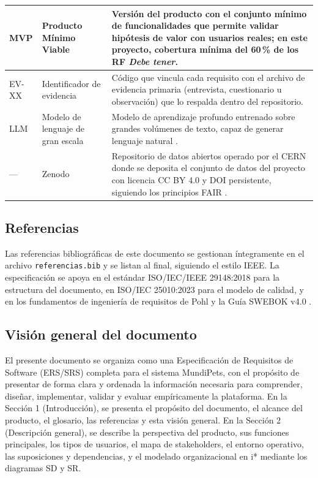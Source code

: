 \documentclass[journal,onecolumn]{IEEEtran}
\begin{document}
\begin{longtable}{|p{2.2cm}|p{3.3cm}|p{9.5cm}|}
		MVP & Producto Mínimo Viable & Versión del producto con el conjunto mínimo de funcionalidades que permite validar hipótesis de valor con usuarios reales; en este proyecto, cobertura mínima del 60\,\% de los RF \emph{Debe tener}. \\ \hline
		
		EV-XX & Identificador de evidencia & Código que vincula cada requisito con el archivo de evidencia primaria (entrevista, cuestionario u observación) que lo respalda dentro del repositorio. \\ \hline
		
		LLM & Modelo de lenguaje de gran escala & Modelo de aprendizaje profundo entrenado sobre grandes volúmenes de texto, capaz de generar lenguaje natural \cite{cheng2026, vogelsang2024}. \\ \hline
		
		--- & Zenodo & Repositorio de datos abiertos operado por el CERN donde se deposita el conjunto de datos del proyecto con licencia CC BY 4.0 y DOI persistente, siguiendo los principios FAIR \cite{wilkinson2016}. \\ \hline
	\end{longtable}
	
	\subsection{Referencias}
	\label{sec:referencias-intro}
	
	Las referencias bibliográficas de este documento se gestionan íntegramente en el
	archivo \texttt{referencias.bib} y se listan al final, siguiendo el estilo IEEE.
	La especificación se apoya en el estándar ISO/IEC/IEEE 29148:2018 \cite{iso29148}
	para la estructura del documento, en ISO/IEC 25010:2023 \cite{iso25010} para el
	modelo de calidad, y en los fundamentos de ingeniería de requisitos de
	Pohl \cite{pohl2025} y la Guía SWEBOK v4.0 \cite{swebok2024}.
	
	\subsection{Visión general del documento}
	\label{sec:vision}
	
	El presente documento se organiza como una Especificación de Requisitos de
	Software (ERS/SRS) completa para el sistema MundiPets, con el propósito de
	presentar de forma clara y ordenada la información necesaria para comprender,
	diseñar, implementar, validar y evaluar empíricamente la plataforma. En la
	Sección 1 (Introducción), se presenta el propósito del documento, el alcance
	del producto, el glosario, las referencias y esta visión general. En la
	Sección 2 (Descripción general), se describe la perspectiva del producto, sus
	funciones principales, los tipos de usuarios, el mapa de stakeholders, el
	entorno operativo, las suposiciones y dependencias, y el modelado
	organizacional en i* mediante los diagramas SD y SR.
	
\end{document}
